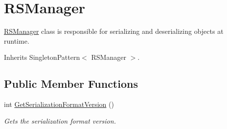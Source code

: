 \hypertarget{class_r_s_manager}{}\section{R\+S\+Manager}
\label{class_r_s_manager}


\hyperlink{class_r_s_manager}{R\+S\+Manager} class is responsible for serializing and deserializing objects at runtime.  




Inherits Singleton\+Pattern$<$ R\+S\+Manager $>$.

\subsection*{Public Member Functions}
\begin{DoxyCompactItemize}
\item 
int \hyperlink{class_r_s_manager_a469b7cced5cfda5b7ce5b108ecd2d3b5}{Get\+Serialization\+Format\+Version} ()
\begin{DoxyCompactList}\small\item\em Gets the serialization format version. \end{DoxyCompactList}\end{DoxyCompactItemize}
